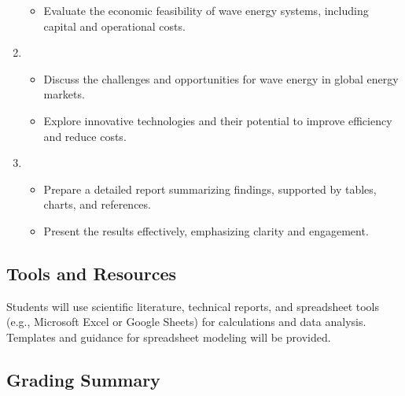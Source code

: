 \documentclass[letterpaper,10pt,english]{jupyterBook}
\begin{document}
\begin{enumerate}
\begin{itemize}
\item {} 
\sphinxAtStartPar
Evaluate the economic feasibility of wave energy systems, including capital and operational costs.

\end{itemize}

\item {} 
\sphinxAtStartPar
{}
\begin{itemize}
\item {} 
\sphinxAtStartPar
Discuss the challenges and opportunities for wave energy in global energy markets.

\item {} 
\sphinxAtStartPar
Explore innovative technologies and their potential to improve efficiency and reduce costs.

\end{itemize}

\item {} 
\sphinxAtStartPar
{}
\begin{itemize}
\item {} 
\sphinxAtStartPar
Prepare a detailed report summarizing findings, supported by tables, charts, and references.

\item {} 
\sphinxAtStartPar
Present the results effectively, emphasizing clarity and engagement.

\end{itemize}

\end{enumerate}


\subsection{Tools and Resources}
\label{\detokenize{ProjectInstructions:id48}}
\sphinxAtStartPar
Students will use scientific literature, technical reports, and spreadsheet tools (e.g., Microsoft Excel or Google Sheets) for calculations and data analysis. Templates and guidance for spreadsheet modeling will be provided.


\subsection{Grading Summary}
\label{\detokenize{ProjectInstructions:id49}}
\end{document}
